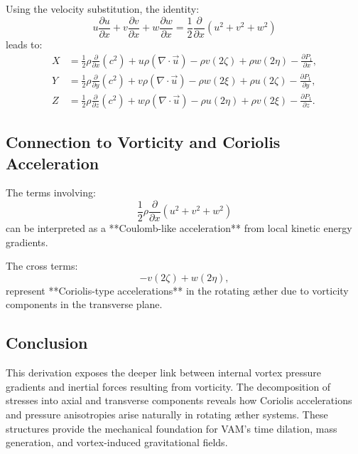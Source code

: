 \documentclass[12pt]{article}
\begin{document}
    Using the velocity substitution, the identity:
    \[
        u \frac{\partial u}{\partial x} + v \frac{\partial v}{\partial x} + w \frac{\partial w}{\partial x} = \frac{1}{2} \frac{\partial}{\partial x}(u^2 + v^2 + w^2)
    \]
    leads to:
    \begin{align}
        X &= \frac{1}{2} \rho \frac{\partial}{\partial x}(c^2)
        + u \rho (\nabla \cdot \vec{u})
        - \rho v (2 \zeta) + \rho w (2 \eta)
        - \frac{\partial P_1}{\partial x}, \\
        Y &= \frac{1}{2} \rho \frac{\partial}{\partial y}(c^2)
        + v \rho (\nabla \cdot \vec{u})
        - \rho w (2 \xi) + \rho u (2 \zeta)
        - \frac{\partial P_1}{\partial y}, \\
        Z &= \frac{1}{2} \rho \frac{\partial}{\partial z}(c^2)
        + w \rho (\nabla \cdot \vec{u})
        - \rho u (2 \eta) + \rho v (2 \xi)
        - \frac{\partial P_1}{\partial z}.
    \end{align}

    \subsection*{Connection to Vorticity and Coriolis Acceleration}
    The terms involving:
    \begin{equation}
        \frac{1}{2} \rho \frac{\partial}{\partial x} (u^2 + v^2 + w^2)
    \end{equation}
    can be interpreted as a **Coulomb-like acceleration** from local kinetic energy gradients.

    The cross terms:
    \begin{equation}
        - v (2 \zeta) + w (2 \eta),
    \end{equation}
    represent **Coriolis-type accelerations** in the rotating æther due to vorticity components in the transverse plane.

    \subsection*{Conclusion}
    This derivation exposes the deeper link between internal vortex pressure gradients and inertial forces resulting from vorticity. The decomposition of stresses into axial and transverse components reveals how Coriolis accelerations and pressure anisotropies arise naturally in rotating æther systems. These structures provide the mechanical foundation for VAM’s time dilation, mass generation, and vortex-induced gravitational fields.
\end{document}
